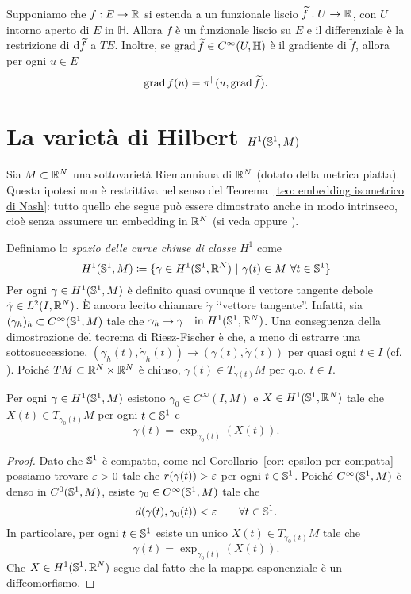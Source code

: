 \begin{oss}\label{oss: estensioni di funzioni}
	Supponiamo che \(f:E \to \mathbb{R}\) si estenda a un funzionale liscio \(\widetilde{f}: U \to \mathbb{R}\), con \(U\) intorno aperto di \(E\) in \(\mathbb{H}\). Allora \(f\) è un funzionale liscio su \(E\) e il differenziale è la restrizione di \(\mathrm{d} \widetilde{f}\) a \(TE\). Inoltre, se \(\operatorname{grad} \widetilde{f} \in C^\infty(U,\mathbb{H})\) è il gradiente di \(\widetilde{f}\), allora per ogni \(u \in E\)
	\[
		\operatorname{grad} f(u) = \pi^\parallel (u,\operatorname{grad} \widetilde{f}) .
	\]
\end{oss}

\section{La varietà di Hilbert \(H^1(\mathbb{S}^1,M)\)}\label{sez: H^1(S,M)}

Sia \(M \subset \mathbb{R}^N\) una sottovarietà Riemanniana di \(\mathbb{R}^N\) (dotato della metrica piatta). Questa ipotesi non è restrittiva nel senso del Teorema~\ref{teo: embedding isometrico di Nash}: tutto quello che segue può essere dimostrato anche in modo intrinseco, cioè senza assumere un embedding in \(\mathbb{R}^N\) (si veda \cite[Chapter~1]{klingenberg2012lectures} oppure \cite[Section~2.3]{klingenberg1995riemannian}). 

Definiamo lo \textit{spazio delle curve chiuse di classe \(H^1\)} come
\[
	H^1(\mathbb{S}^1,M) \coloneq \{ \gamma \in H^1(\mathbb{S}^1,\mathbb{R}^N) \ | \ \gamma(t) \in M \ \forall t \in \mathbb{S}^1\}
\]
Per ogni \(\gamma \in H^1(\mathbb{S}^1,M)\) è definito quasi ovunque il vettore tangente debole \(\dot \gamma \in L^2(I,\mathbb{R}^N)\). È ancora lecito chiamare \(\dot \gamma\) ‘‘vettore tangente''. Infatti, sia \((\gamma_h)_h \subset C^\infty(\mathbb{S}^1,M)\) tale che \(\gamma_h \to \gamma \quad \text{in }H^1(\mathbb{S}^1,\mathbb{R}^N)\).
Una conseguenza della dimostrazione del teorema di Riesz-Fischer è che, a meno di estrarre una sottosuccessione, \((\gamma_h(t),\dot \gamma_h(t)) \to (\gamma(t),\dot \gamma(t))\) per quasi ogni \(t \in I\) (cf. \cite[Theorem 4.9]{brezis2011functional}). Poiché \(TM \subset \mathbb{R}^N \times \mathbb{R}^N\) è chiuso, \(\dot \gamma(t) \in T_{\gamma(t)}M\) per q.o. \(t \in I\).

\begin{prop}\label{prop: approssimazione con curve lisce}
	Per ogni \(\gamma \in H^1(\mathbb{S}^1,M)\) esistono \(\gamma_0 \in C^\infty(I,M)\) e \(X \in H^1(\mathbb{S}^1,\mathbb{R}^N)\) tale che \(X(t) \in T_{\gamma_0(t)}M\) per ogni \(t \in \mathbb{S}^1\) e
	\[
		\gamma(t) = \exp_{\gamma_0(t)}(X(t)).
	\]
\end{prop}
\begin{proof}
	Dato che \(\mathbb{S}^1\) è compatto, come nel Corollario~\ref{cor: epsilon per compatta} possiamo trovare \(\varepsilon >0\) tale che \(r(\gamma(t))> \varepsilon\) per ogni \(t \in \mathbb{S}^1\). Poiché \(C^\infty(\mathbb{S}^1,M)\) è denso in \(C^0(\mathbb{S}^1,M)\), esiste \(\gamma_0 \in C^\infty(\mathbb{S}^1,M)\) tale che
	\[
	d(\gamma(t),\gamma_0(t)) < \varepsilon \qquad \forall t \in \mathbb{S}^1.
	\]
	In particolare, per ogni \(t \in \mathbb{S}^1\) esiste un unico \(X(t) \in T_{\gamma_0(t)}M\) tale che
	\[
	\gamma(t) = \exp_{\gamma_0(t)}(X(t)).
	\]
	Che \(X \in H^1(\mathbb{S}^1,\mathbb{R}^N)\) segue dal fatto che la mappa esponenziale è un diffeomorfismo. 
\end{proof}


